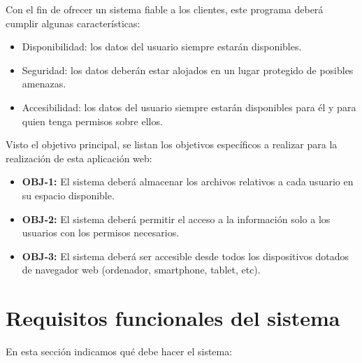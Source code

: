 Con el fin de ofrecer un sistema fiable a los clientes, este programa deberá cumplir algunas características:
\begin{itemize}
	\item Disponibilidad: los datos del usuario siempre estarán disponibles.
	\item Seguridad: los datos deberán estar alojados en un lugar protegido de posibles amenazas.
	\item Accesibilidad: los datos del usuario siempre estarán disponibles para él y para quien tenga permisos sobre ellos.
\end{itemize}

Visto el objetivo principal, se listan los objetivos específicos a realizar para la realización de esta aplicación web:
\begin{itemize}
	\item \textbf{OBJ-1:} El sistema deberá almacenar los archivos relativos a cada usuario en su espacio disponible.
	\item \textbf{OBJ-2:} El sistema deberá permitir el acceso a la información solo a los usuarios con los permisos necesarios.
	\item \textbf{OBJ-3:} El sistema deberá ser accesible desde todos los dispositivos dotados de navegador web (ordenador, smartphone, tablet, etc).
\end{itemize}

\section{Requisitos funcionales del sistema}
En esta sección indicamos qué debe hacer el sistema:

